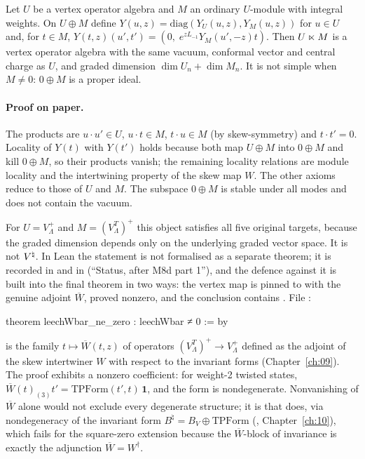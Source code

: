 \begin{proposition}\label{ch15:prop:sqzero}
Let $U$ be a vertex operator algebra and $M$ an ordinary $U$-module with integral weights. On
$U\oplus M$ define $Y(u,z)=\mathrm{diag}(Y_U(u,z),Y_M(u,z))$ for $u\in U$ and, for $t\in M$,
$Y(t,z)(u',t')=(0,\;e^{zL_{-1}}Y_M(u',-z)t)$. Then $U\mathbin{\ltimes} M$ is a vertex operator algebra with
the same vacuum, conformal vector and central charge as $U$, and graded dimension
$\dim U_n+\dim M_n$. It is not simple when $M\ne0$: $0\oplus M$ is a proper ideal.
\end{proposition}

\paragraph{Proof on paper.} The products are $u\cdot u'\in U$, $u\cdot t\in M$, $t\cdot u\in M$ (by
skew-symmetry) and $t\cdot t'=0$. Locality of $Y(t)$ with $Y(t')$ holds because both map $U\oplus M$
into $0\oplus M$ and kill $0\oplus M$, so their products vanish; the remaining locality relations
are module locality and the intertwining property of the skew map $W$. The other axioms reduce to
those of $U$ and $M$. The subspace $0\oplus M$ is stable under all modes and does not contain the
vacuum.

For $U=V_\Lambda^+$ and $M=(V_\Lambda^T)^+$ this object satisfies all five original targets,
because the graded dimension depends only on the underlying graded vector space. It is not ${V^{\natural}}$.
In Lean the statement is not formalised as a separate theorem; it is recorded in
 and in  (``Status, after M8d
part 1''), and the defence against it is built into the final theorem in two ways: the vertex map
is pinned to  with the genuine adjoint $\overline W$, proved nonzero, and
the conclusion contains . File :
\begin{leancode}
theorem leechWbar_ne_zero : leechWbar ≠ 0 := by
\end{leancode}

\begin{dictionary}
 is the family $t\mapsto\overline W(t,z)$ of operators $(V_\Lambda^T)^+\to V_\Lambda^+$
defined as the adjoint of the skew intertwiner $W$ with respect to the invariant forms
(Chapter~\ref{ch:09}). The proof exhibits a nonzero coefficient: for weight-2 twisted states,
$\overline W(t)_{(3)}t'=\mathrm{TPForm}(t',t)\,\mathbf 1$, and the form  is
nondegenerate. Nonvanishing of $\overline W$ alone would not exclude every degenerate structure; it is
 that does, via nondegeneracy of the invariant form $B^\natural=B_V\oplus\mathrm{TPForm}$
(, Chapter~\ref{ch:10}), which fails for the square-zero extension
because the $\overline W$-block of invariance is exactly the adjunction $\overline W=W^\dagger$.
\end{dictionary}

